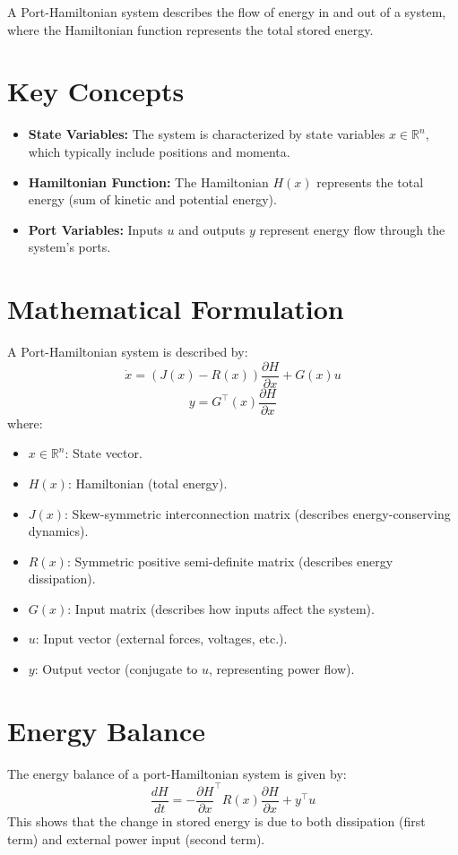 A Port-Hamiltonian system describes the flow of energy in and out of a system, where the Hamiltonian function represents the total stored energy.

\section{Key Concepts}
\begin{itemize}
    \item \textbf{State Variables:} The system is characterized by state variables $x \in \mathbb{R}^n$, which typically include positions and momenta.
    \item \textbf{Hamiltonian Function:} The Hamiltonian $H(x)$ represents the total energy (sum of kinetic and potential energy).
    \item \textbf{Port Variables:} Inputs $u$ and outputs $y$ represent energy flow through the system's ports.
\end{itemize}

\section{Mathematical Formulation}
A Port-Hamiltonian system is described by:
\[
\dot{x} = \left( J(x) - R(x) \right) \frac{\partial H}{\partial x} + G(x) u
\]
\[
y = G^\top(x) \frac{\partial H}{\partial x}
\]
where:
\begin{itemize}
    \item $x \in \mathbb{R}^n$: State vector.
    \item $H(x)$: Hamiltonian (total energy).
    \item $J(x)$: Skew-symmetric interconnection matrix (describes energy-conserving dynamics).
    \item $R(x)$: Symmetric positive semi-definite matrix (describes energy dissipation).
    \item $G(x)$: Input matrix (describes how inputs affect the system).
    \item $u$: Input vector (external forces, voltages, etc.).
    \item $y$: Output vector (conjugate to $u$, representing power flow).
\end{itemize}

\section{Energy Balance}
The energy balance of a port-Hamiltonian system is given by:
\[
\frac{dH}{dt} = -\frac{\partial H}{\partial x}^\top R(x) \frac{\partial H}{\partial x} + y^\top u
\]
This shows that the change in stored energy is due to both dissipation (first term) and external power input (second term).

